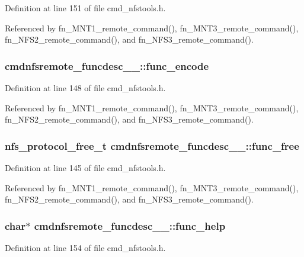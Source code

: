 Definition at line 151 of file cmd\_\-nfstools.h.

Referenced by fn\_\-MNT1\_\-remote\_\-command(), fn\_\-MNT3\_\-remote\_\-command(), fn\_\-NFS2\_\-remote\_\-command(), and fn\_\-NFS3\_\-remote\_\-command().
\subsubsection{ {\bf cmdnfsremote\_\-funcdesc\_\-\_\-::func\_\-encode}}\label{structcmdnfsremote__funcdesc_____o3}




Definition at line 148 of file cmd\_\-nfstools.h.

Referenced by fn\_\-MNT1\_\-remote\_\-command(), fn\_\-MNT3\_\-remote\_\-command(), fn\_\-NFS2\_\-remote\_\-command(), and fn\_\-NFS3\_\-remote\_\-command().
\subsubsection{\setlength{\rightskip}{0pt plus 5cm}nfs\_\-protocol\_\-free\_\-t {\bf cmdnfsremote\_\-funcdesc\_\-\_\-::func\_\-free}}\label{structcmdnfsremote__funcdesc_____o2}




Definition at line 145 of file cmd\_\-nfstools.h.

Referenced by fn\_\-MNT1\_\-remote\_\-command(), fn\_\-MNT3\_\-remote\_\-command(), fn\_\-NFS2\_\-remote\_\-command(), and fn\_\-NFS3\_\-remote\_\-command().
\subsubsection{\setlength{\rightskip}{0pt plus 5cm}char$\ast$ {\bf cmdnfsremote\_\-funcdesc\_\-\_\-::func\_\-help}}\label{structcmdnfsremote__funcdesc_____o5}




Definition at line 154 of file cmd\_\-nfstools.h.


